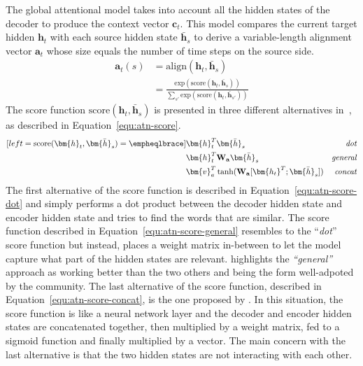  The global attentional model takes into account all the hidden states of the decoder to produce the context vector $\bm{c}_t$. This model compares the current target hidden $\bm{h}_t$ with each source hidden state $\bm{\bar{h}}_s$ to derive a variable-length alignment vector $\bm{a}_t$ whose size equals the number of time steps on the source side.
 \begin{align}
    \bm{a}_t(s) &= \mathrm{align}(\bm{h}_t, \bm{\bar{h}}_s)\\
    \label{equ:atn-a_t}
    &= \frac{\mathrm{exp}(\mathrm{score}(\bm{h}_t, \bm{\bar{h}}_s))}{\sum_{s'} \mathrm{exp}(\mathrm{score}(\bm{h}_t, \bm{\bar{h}}_{s'}))}
 \end{align}
The score function $\mathrm{score}(\bm{h}_t, \bm{\bar{h}}_s)$ is presented in three different alternatives in~\citet{1508.04025}, as described in Equation~\ref{equ:atn-score}.
\begin{subequations}
    \label{equ:atn-score}
    \begin{align}[left ={\mathrm{score}(\bm{h}_t, \bm{\bar{h}}_s) = \empheqlbrace}]
        & \bm{h}_t^T \bm{\bar{h}}_s & \mathit{dot} \label{equ:atn-score-dot}\\
        & \bm{h}_t^T \mathbf{W_a} \bm{\bar{h}}_s & \mathit{general} \label{equ:atn-score-general}\\
        & \bm{v}_a^T \tanh ( \mathbf{W_a} [\bm{h_t}^T;\bm{\bar{h}}_s]) & \mathit{concat} \label{equ:atn-score-concat}
    \end{align}
\end{subequations}
The first alternative of the score function is described in Equation~\ref{equ:atn-score-dot} and simply performs a dot product between the decoder hidden state and encoder hidden state and tries to find the words that are similar.
The score function described in Equation~\ref{equ:atn-score-general} resembles to the ``\textit{dot}'' score function but instead, places a weight matrix in-between to let the model capture what part of the hidden states are relevant. \citet{youtube-nmt-attention} highlights the \textit{``general''} approach as working better than the two others and being the form well-adpoted by the community.
The last alternative of the score function, described in Equation~\ref{equ:atn-score-concat}, is the one proposed by \citet{1409.0473}. In this situation, the score function is like a neural network layer and the decoder and encoder hidden states are concatenated together, then multiplied by a weight matrix, fed to a sigmoid function and finally multiplied by a vector. The main concern with the last alternative is that the two hidden states are not interacting with each other.

